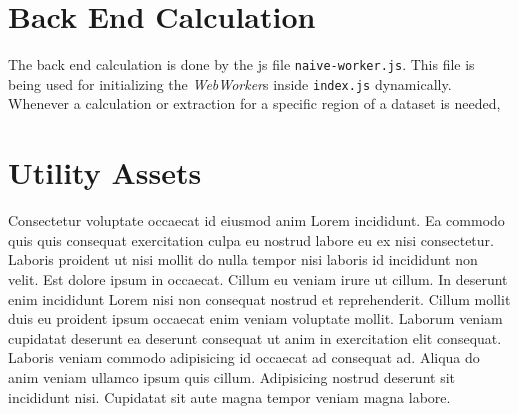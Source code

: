 \section{Back End Calculation}

The back end calculation is done by the \gls{js} file \texttt{naive-worker.js}. This file is being used for initializing the \emph{WebWorker}s inside \texttt{index.js} dynamically. Whenever a calculation or extraction for a specific region of a dataset is needed, 

\section{Utility Assets}

Consectetur voluptate occaecat id eiusmod anim Lorem incididunt. Ea commodo quis quis consequat exercitation culpa eu nostrud labore eu ex nisi consectetur. Laboris proident ut nisi mollit do nulla tempor nisi laboris id incididunt non velit. Est dolore ipsum in occaecat. Cillum eu veniam irure ut cillum. In deserunt enim incididunt Lorem nisi non consequat nostrud et reprehenderit. Cillum mollit duis eu proident ipsum occaecat enim veniam voluptate mollit. Laborum veniam cupidatat deserunt ea deserunt consequat ut anim in exercitation elit consequat. Laboris veniam commodo adipisicing id occaecat ad consequat ad. Aliqua do anim veniam ullamco ipsum quis cillum. Adipisicing nostrud deserunt sit incididunt nisi. Cupidatat sit aute magna tempor veniam magna labore.